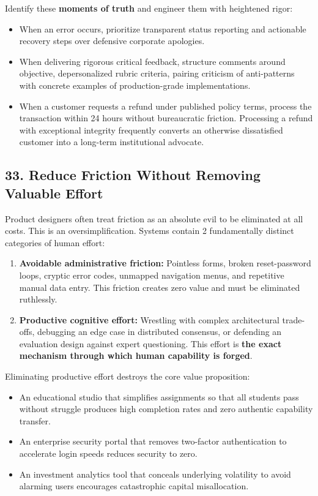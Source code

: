 Identify these \textbf{moments of truth} and engineer them with heightened rigor:
\begin{itemize}
    \item When an error occurs, prioritize transparent status reporting and actionable recovery steps over defensive corporate apologies.
    \item When delivering rigorous critical feedback, structure comments around objective, depersonalized rubric criteria, pairing criticism of anti-patterns with concrete examples of production-grade implementations.
    \item When a customer requests a refund under published policy terms, process the transaction within 24 hours without bureaucratic friction. Processing a refund with exceptional integrity frequently converts an otherwise dissatisfied customer into a long-term institutional advocate.
\end{itemize}

\subsection*{33. Reduce Friction Without Removing Valuable Effort}

Product designers often treat friction as an absolute evil to be eliminated at all costs. This is an oversimplification. Systems contain 2 fundamentally distinct categories of human effort:
\begin{enumerate}
    \item \textbf{Avoidable administrative friction:} Pointless forms, broken reset-password loops, cryptic error codes, unmapped navigation menus, and repetitive manual data entry. This friction creates zero value and must be eliminated ruthlessly.
    \item \textbf{Productive cognitive effort:} Wrestling with complex architectural trade-offs, debugging an edge case in distributed consensus, or defending an evaluation design against expert questioning. This effort is \textbf{the exact mechanism through which human capability is forged}.
\end{enumerate}

Eliminating productive effort destroys the core value proposition:
\begin{itemize}
    \item An educational studio that simplifies assignments so that all students pass without struggle produces high completion rates and zero authentic capability transfer.
    \item An enterprise security portal that removes two-factor authentication to accelerate login speeds reduces security to zero.
    \item An investment analytics tool that conceals underlying volatility to avoid alarming users encourages catastrophic capital misallocation.
\end{itemize}

